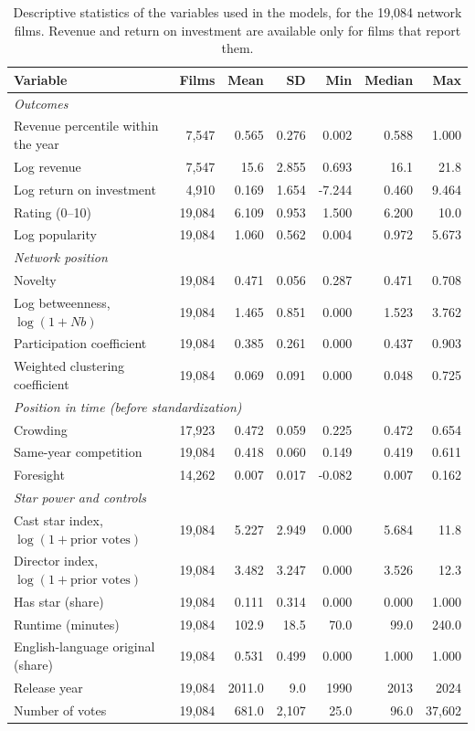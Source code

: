 \begin{table}[htbp]
\centering
\small
\caption[Descriptive statistics]{Descriptive statistics of the variables used in the models, for the 19,084 network films. Revenue and return on investment are available only for films that report them.}
\label{tab:descriptives}
\setlength{\tabcolsep}{4pt}
\begin{tabular}{lrrrrrr}
\hline
Variable & Films & Mean & SD & Min & Median & Max \\
\hline
\multicolumn{7}{l}{\textit{Outcomes}} \\
Revenue percentile within the year & 7,547 & 0.565 & 0.276 & 0.002 & 0.588 & 1.000 \\
Log revenue & 7,547 & 15.6 & 2.855 & 0.693 & 16.1 & 21.8 \\
Log return on investment & 4,910 & 0.169 & 1.654 & -7.244 & 0.460 & 9.464 \\
Rating (0--10) & 19,084 & 6.109 & 0.953 & 1.500 & 6.200 & 10.0 \\
Log popularity & 19,084 & 1.060 & 0.562 & 0.004 & 0.972 & 5.673 \\
\multicolumn{7}{l}{\textit{Network position}} \\
Novelty & 19,084 & 0.471 & 0.056 & 0.287 & 0.471 & 0.708 \\
Log betweenness, $\log(1 + N b)$ & 19,084 & 1.465 & 0.851 & 0.000 & 1.523 & 3.762 \\
Participation coefficient & 19,084 & 0.385 & 0.261 & 0.000 & 0.437 & 0.903 \\
Weighted clustering coefficient & 19,084 & 0.069 & 0.091 & 0.000 & 0.048 & 0.725 \\
\multicolumn{7}{l}{\textit{Position in time (before standardization)}} \\
Crowding & 17,923 & 0.472 & 0.059 & 0.225 & 0.472 & 0.654 \\
Same-year competition & 19,084 & 0.418 & 0.060 & 0.149 & 0.419 & 0.611 \\
Foresight & 14,262 & 0.007 & 0.017 & -0.082 & 0.007 & 0.162 \\
\multicolumn{7}{l}{\textit{Star power and controls}} \\
Cast star index, $\log(1 + \text{prior votes})$ & 19,084 & 5.227 & 2.949 & 0.000 & 5.684 & 11.8 \\
Director index, $\log(1 + \text{prior votes})$ & 19,084 & 3.482 & 3.247 & 0.000 & 3.526 & 12.3 \\
Has star (share) & 19,084 & 0.111 & 0.314 & 0.000 & 0.000 & 1.000 \\
Runtime (minutes) & 19,084 & 102.9 & 18.5 & 70.0 & 99.0 & 240.0 \\
English-language original (share) & 19,084 & 0.531 & 0.499 & 0.000 & 1.000 & 1.000 \\
Release year & 19,084 & 2011.0 & 9.0 & 1990 & 2013 & 2024 \\
Number of votes & 19,084 & 681.0 & 2,107 & 25.0 & 96.0 & 37,602 \\
\hline
\end{tabular}
\end{table}
